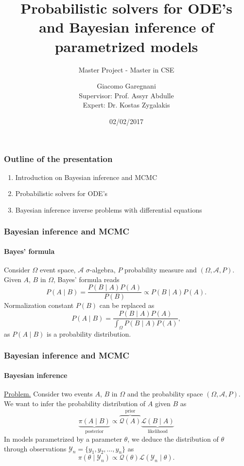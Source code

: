 \documentclass{beamer}
\title{Probabilistic solvers for ODE's \\ and Bayesian inference of parametrized models}
\subtitle{Master Project - Master in CSE}
\author{Giacomo Garegnani \\ Supervisor: Prof. Assyr Abdulle \\ Expert: Dr. Kostas Zygalakis}
\institute{EPFL}
\date{02/02/2017}
\begin{document}
\frame{\titlepage}

\begin{frame}
	\frametitle{Outline of the presentation}
	\begin{enumerate}
		\item Introduction on Bayesian inference and MCMC
		\item Probabilistic solvers for ODE's
		\item Bayesian inference inverse problems with differential equations
	\end{enumerate}
\end{frame}


\begin{frame}
	\frametitle{Bayesian inference and MCMC}
	\framesubtitle{Bayes' formula}
	
	Consider $\Omega$ event space, $\mathcal{A}$  $\sigma$-algebra, $P$ probability measure and $(\Omega, \mathcal{A}, P)$. Given $A$, $B$ in $\Omega$, Bayes' formula reads 
	\begin{equation*}
		P(A\mid B) = \frac{P(B\mid A)P(A)}{P(B)} \propto P(B\mid A)P(A).
	\end{equation*}
	Normalization constant $P(B)$ can be replaced as
	\begin{equation*}
		P(A\mid B) = \frac{P(B\mid A)P(A)}{\int_{\Omega}P(B\mid A)P(A)},
	\end{equation*}
	as $P(A\mid B)$ is a probability distribution.
\end{frame}

\begin{frame}
	\frametitle{Bayesian inference and MCMC}
	\framesubtitle{Bayesian inference}
	
	\underline{Problem.} Consider two events $A$, $B$ in $\Omega$ and the probability space $(\Omega, \mathcal{A}, P)$. We want to infer the probability distribution of $A$ given $B$ as
	\begin{equation*}
		\underbrace{\pi(A\mid B)}_{\text{posterior}} \propto \overbrace{\mathcal{Q}(A)}^{\text{prior}} \underbrace{\mathcal{L}(B \mid A)}_{\text{likelihood}}
	\end{equation*}
	In models parametrized by a parameter $\theta$, we deduce the distribution of $\theta$ through observations $\mathcal{Y}_n = \{y_1, y_2, \ldots, y_n\}$ as
	\begin{equation*}
		\pi(\theta\mid\mathcal{Y}_n) \propto \mathcal{Q}(\theta) \mathcal{L}(\mathcal{Y}_n \mid \theta).
	\end{equation*}
\end{frame}
\end{document}
